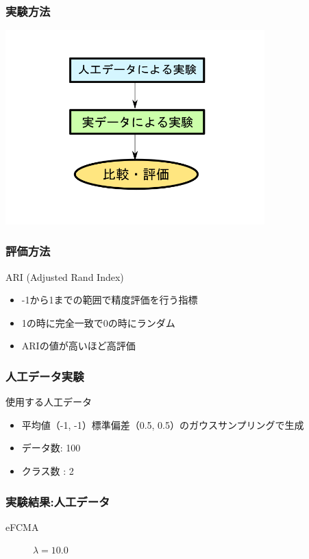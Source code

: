 \documentclass[13pt,dvipdfmx]{beamer}
\begin{document}
\begin{frame}\frametitle{実験方法}
\begin{center}
 \includegraphics[width=100mm]{experiment_process.png}
\end{center}
\end{frame}

\begin{frame}\frametitle{評価方法}
\begin{block}{ARI (Adjusted Rand Index)}
\begin{itemize}
 \item -1から1までの範囲で精度評価を行う指標
 \item 1の時に完全一致で0の時にランダム
 \item ARIの値が高いほど高評価
\end{itemize}
\end{block}
\begin{center}
\end{center}
\end{frame}

\begin{frame}\frametitle{人工データ実験}
  \begin{block}{使用する人工データ}
    \begin{itemize}
    \item 平均値（-1, -1）標準偏差（0.5, 0.5）のガウスサンプリングで生成
   　\item データ数: 100
    \item クラス数 : 2
    \end{itemize}
  \end{block}
\end{frame}

\begin{frame}\frametitle{実験結果:人工データ}
  \begin{block}{eFCMA}
   \begin{figure}[htbp]
    \begin{center}
   \end{center}
   \captionsetup{labelformat=empty,labelsep=none}
   \caption{$\lambda=10.0$}
  \end{figure}
 \end{block}
\end{frame}
\end{document}
